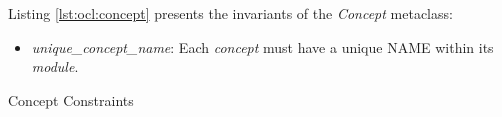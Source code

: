 Listing \ref{lst:ocl:concept} presents the invariants of the \emph{Concept} metaclass:

\begin{itemize}

\item \emph{unique\_concept\_name}:
Each \emph{concept} must have a unique NAME within its \emph{module}.

\end{itemize}

\begin{code}

\caption{Concept Constraints}
\label{lst:ocl:concept}
\end{code}
